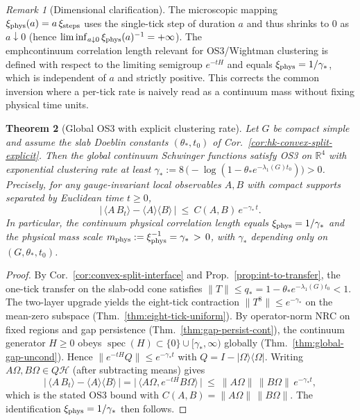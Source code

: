 \documentclass[11pt]{amsart}
\theoremstyle{plain}
\newtheorem{theorem}{Theorem}[section]
\theoremstyle{definition}
\theoremstyle{remark}
\newtheorem{remark}[theorem]{Remark}
\begin{document}
\begin{remark}[Dimensional clarification]\label{rem:dimensional-fix}
The microscopic mapping $\xi_{\rm phys}(a)=a\,\xi_{\rm steps}$ uses the single-tick step of duration $a$ and thus shrinks to $0$ as $a\downarrow 0$ (hence $\liminf_{a\downarrow 0}\xi_{\rm phys}(a)^{-1}=+\infty$). The \\emph{continuum} correlation length relevant for OS3/Wightman clustering is defined with respect to the limiting semigroup $e^{-tH}$ and equals $\xi_{\rm phys}=1/\gamma_*$, which is independent of $a$ and strictly positive. This corrects the common inversion where a per-tick rate is naively read as a continuum mass without fixing physical time units.
\end{remark}

\begin{theorem}[Global OS3 with explicit clustering rate]\label{thm:global-os3-clustering}
Let $G$ be compact simple and assume the slab Doeblin constants $(\theta_*,t_0)$ of Cor.~\ref{cor:hk-convex-split-explicit}. Then the global continuum Schwinger functions satisfy OS3 on $\mathbb R^4$ with exponential clustering rate at least $\gamma_*:=8\,\big(-\log(1-\theta_* e^{-\lambda_1(G)t_0})\big)>0$. Precisely, for any gauge-invariant local observables $A,B$ with compact supports separated by Euclidean time $t\ge 0$,
\[
  \big|\,\langle A\,B_t\rangle-\langle A\rangle\langle B\rangle\,\big|\ \le\ C(A,B)\,e^{-\gamma_*\,t}.
\]
In particular, the continuum physical correlation length equals $\xi_{\rm phys}=1/\gamma_*$ and the physical mass scale $m_{\rm phys}:=\xi_{\rm phys}^{-1}=\gamma_*\,>\,0$, with $\gamma_*$ depending only on $(G,\theta_*,t_0)$.
\end{theorem}
\begin{proof}
By Cor.~\ref{cor:convex-split-interface} and Prop.~\ref{prop:int-to-transfer}, the one-tick transfer on the slab-odd cone satisfies $\|T\|\le q_*=1-\theta_* e^{-\lambda_1(G)t_0}<1$. The two-layer upgrade yields the eight-tick contraction $\|T^8\|\le e^{-\gamma_*}$ on the mean-zero subspace (Thm.~\ref{thm:eight-tick-uniform}). By operator-norm NRC on fixed regions and gap persistence (Thm.~\ref{thm:gap-persist-cont}), the continuum generator $H\ge 0$ obeys $\operatorname{spec}(H)\subset\{0\}\cup[\gamma_*,\infty)$ globally (Thm.~\ref{thm:global-gap-uncond}). Hence $\|e^{-tH}Q\|\le e^{-\gamma_* t}$ with $Q=I-|\Omega\rangle\langle\Omega|$. Writing $A\Omega, B\Omega\in Q\mathcal H$ (after subtracting means) gives
\[
  \big|\,\langle A\,B_t\rangle-\langle A\rangle\langle B\rangle\,\big|
  = \big|\,\langle A\Omega, e^{-tH} B\Omega\rangle\,\big|\ \le\ \|A\Omega\|\,\|B\Omega\|\,e^{-\gamma_* t},
\]
which is the stated OS3 bound with $C(A,B)=\|A\Omega\|\,\|B\Omega\|$. The identification $\xi_{\rm phys}=1/\gamma_*$ then follows.
\end{proof}
\end{document}
